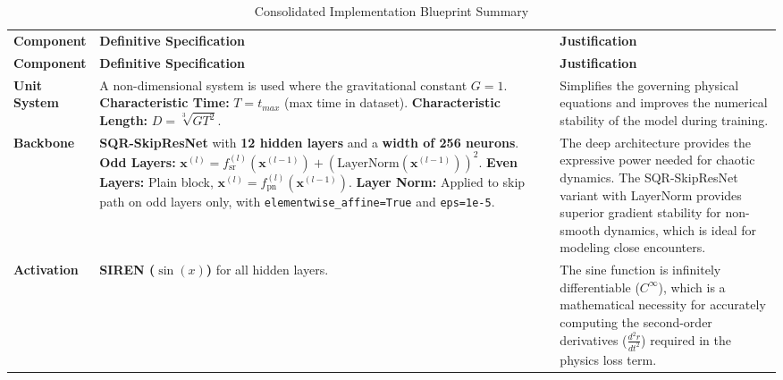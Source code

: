 \begin{small}
\begin{longtable}{|>{\raggedright\arraybackslash}p{}|>{\raggedright\arraybackslash}p{}|>{\raggedright\arraybackslash}p{}|}
\caption{Consolidated Implementation Blueprint Summary}\label{tab:blueprint_summary} \\
\hline
\multicolumn{3}{|c|}{\textbf{Consolidated Implementation Blueprint Summary}} \\
\hline
\textbf{Component} & \textbf{Definitive Specification} & \textbf{Justification} \\
\hline
\endfirsthead
\hline
\textbf{Component} & \textbf{Definitive Specification} & \textbf{Justification} \\
\hline
\endhead
\textbf{Unit System} & A non-dimensional system is used where the gravitational constant $G=1$. \newline \textbullet{} \textbf{Characteristic Time:} $T=t_{max}$ (max time in dataset). \newline \textbullet{} \textbf{Characteristic Length:} $D=\sqrt[3]{GT^{2}}$. & Simplifies the governing physical equations and improves the numerical stability of the model during training. \\
\hline
\textbf{Backbone} & \textbf{SQR-SkipResNet} with \textbf{12 hidden layers} and a \textbf{width of 256 neurons}. \newline \textbullet{} \textbf{Odd Layers:} $\mathbf{x}^{(l)} = f_{\text{sr}}^{(l)}(\mathbf{x}^{(l-1)}) + (\mathrm{LayerNorm}(\mathbf{x}^{(l-1)}))^2$. \newline \textbullet{} \textbf{Even Layers:} Plain block, $\mathbf{x}^{(l)} = f_{\text{pn}}^{(l)}(\mathbf{x}^{(l-1)})$. \newline \textbullet{} \textbf{Layer Norm:} Applied to skip path on odd layers only, with \texttt{elementwise\_affine=True} and \texttt{eps=1e-5}. & The deep architecture provides the expressive power needed for chaotic dynamics. The SQR-SkipResNet variant with LayerNorm provides superior gradient stability for non-smooth dynamics, which is ideal for modeling close encounters. \\
\hline
\textbf{Activation} & \textbf{SIREN ($\sin(x)$)} for all hidden layers. & The sine function is infinitely differentiable ($C^{\infty}$), which is a mathematical necessity for accurately computing the second-order derivatives ($\frac{d^{2}r}{dt^{2}}$) required in the physics loss term. \\
\hline

\end{longtable}
\end{small}

